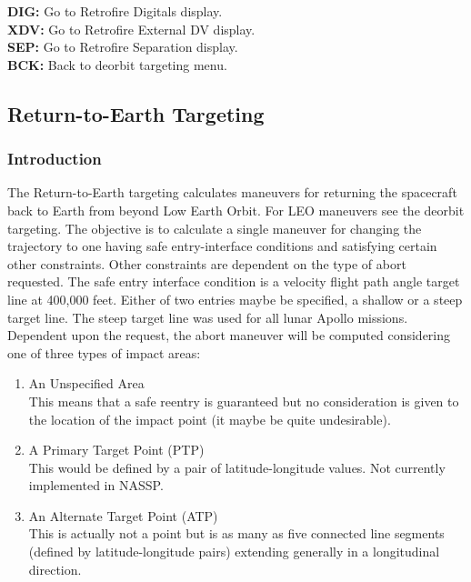 \documentclass[11pt]{article} %
\begin{document}
\textbf{DIG:} Go to Retrofire Digitals display.\\
\textbf{XDV:} Go to Retrofire External DV display.\\
\textbf{SEP:} Go to Retrofire Separation display.\\
\textbf{BCK:} Back to deorbit targeting menu.\\

\newpage
\subsection{Return-to-Earth Targeting}

\subsubsection{Introduction}

The Return-to-Earth targeting calculates maneuvers for returning the spacecraft back to Earth from beyond Low Earth Orbit. For LEO maneuvers see the deorbit targeting. The objective is to calculate a single maneuver for changing the trajectory to one having safe entry-interface conditions and satisfying certain other constraints. Other constraints are dependent on the type of abort requested. The safe entry interface condition is a velocity flight path angle target line at 400,000 feet. Either of two entries maybe be specified, a shallow or a steep target line. The steep target line was used for all lunar Apollo missions.\\

Dependent upon the request, the abort maneuver will be computed considering one of three types of impact areas:

\begin{enumerate}
	\item An Unspecified Area\\
	This means that a safe reentry is guaranteed but no consideration is given to the location of the impact point (it maybe be quite undesirable).
	\item A Primary Target Point (PTP)\\
	This would be defined by a pair of latitude-longitude values. Not currently implemented in NASSP.
	\item An Alternate Target Point (ATP)\\
	This is actually not a point but is as many as five connected line segments (defined by latitude-longitude pairs) extending generally in a longitudinal direction.\\
\end{enumerate}
\end{document}
